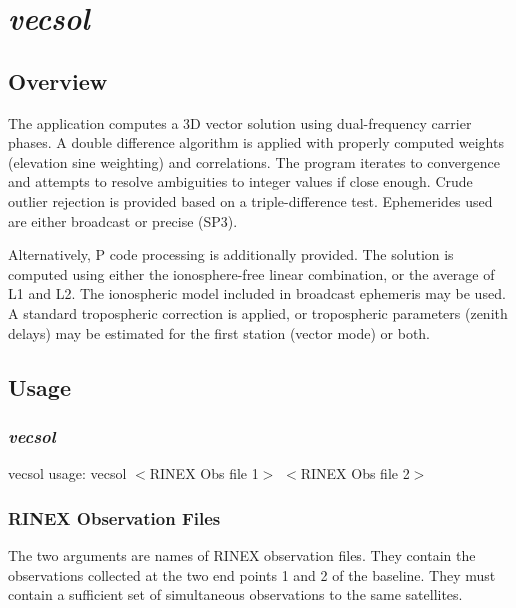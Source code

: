 %
%


\section{\emph{vecsol}}
\subsection{Overview}
The application computes a 3D vector solution using dual-frequency carrier phases. A double difference
algorithm is applied with properly computed weights (elevation sine weighting) and correlations. The program
iterates to convergence and attempts to resolve ambiguities to integer values if close enough. Crude outlier rejection
is provided based on a triple-difference test. Ephemerides used are either broadcast or precise (SP3). 

Alternatively, P code processing is additionally provided.
The solution is computed using either the ionosphere-free linear
combination, or the average of L1 and L2. The ionospheric model included
in broadcast ephemeris may be used. A standard tropospheric correction
is applied, or tropospheric parameters (zenith delays) may be estimated
for the first station (vector mode) or both.

\subsection{Usage}
\subsubsection{\emph{vecsol}}
\begin{\outputsize}
vecsol usage: vecsol $<$RINEX Obs file 1$>$ $<$RINEX Obs file 2$>$
\end{\outputsize}

\subsubsection{RINEX Observation Files}
The two arguments are names of RINEX observation files. They contain the observations collected at the two end points 1 and 2 of the baseline.
They must contain a sufficient set of simultaneous observations to the same satellites.

